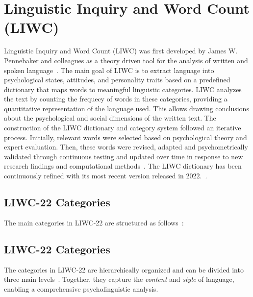 \section{Linguistic Inquiry and Word Count (LIWC)}
Linguistic Inquiry and Word Count (LIWC) was first developed by James W. Pennebaker and colleagues as a theory driven tool for the analysis of written and spoken language~\cite{tausczik2010psychological}. 
The main goal of LIWC is to extract language into psychological states, attitudes, and personality traits based on a predefined dictionary that maps words to meaningful linguistic categories. LIWC analyzes the text by counting the frequecy of words in these categories, providing a quantitative representation of the language used. This allows drawing conclusions about the psychological and social dimensions of the written text.
The construction of the LIWC dictionary and category system followed an iterative process. Initially, relevant words were selected based on psychological theory and expert evaluation. Then, these words were revised, adapted and psychometrically validated through continuous testing and updated over time in response to new research findings and computational methods~\cite{tausczik2010psychological}. The LIWC dictionary has been continuously refined with its most recent version released in 2022.~\cite{pennebaker2022liwc}.


\subsection{LIWC-22 Categories}
The main categories in LIWC-22 are structured as follows~\cite{pennebaker2022liwc}:

\subsection{LIWC-22 Categories}

The categories in LIWC-22 are hierarchically organized and can be divided into three main levels~\cite{pennebaker2022liwc,tausczik2010psychological}. Together, they capture the \textit{content} and \textit{style} of language, enabling a comprehensive psycholinguistic analysis.

